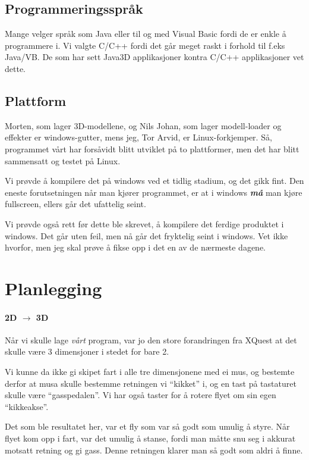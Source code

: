 \documentclass[11pt, dvips]{report}
\begin{document}
\section{Programmeringsspråk}

Mange velger språk som Java eller til og med Visual Basic fordi de er
enkle å programmere i. Vi valgte C/C++ fordi det går meget raskt i
forhold til f.eks Java/VB. De som har sett Java3D applikasjoner kontra
C/C++ applikasjoner vet dette.

\section{Plattform}

Morten, som lager 3D-modellene, og Nils Johan, som lager modell-loader
og effekter er windows-gutter, mens jeg, Tor Arvid, er
Linux-forkjemper. Så, programmet vårt har forsåvidt blitt utviklet på
to plattformer, men det har blitt sammensatt og testet på Linux.

Vi prøvde å kompilere det på windows ved et tidlig stadium, og det
gikk fint. Den eneste forutsetningen når man kjører programmet, er at
i windows \emph{\bf{må}} man kjøre fullscreen, ellers går det
ufattelig seint.

Vi prøvde også rett før dette ble skrevet, å kompilere det ferdige
produktet i windows. Det går uten feil, men nå går det fryktelig seint
i windows. Vet ikke hvorfor, men jeg skal prøve å fikse opp i det en
av de nærmeste dagene.

\chapter{Planlegging}

\subsubsection{2D $\rightarrow$ 3D}

Når vi skulle lage \emph{vårt} program, var jo den store forandringen
fra XQuest at det skulle være 3 dimensjoner i stedet for bare 2.

Vi kunne da ikke gi skipet fart i alle tre dimensjonene med ei mus, og
bestemte derfor at musa skulle bestemme retningen vi ``kikket'' i, og
en tast på tastaturet skulle være ``gasspedalen''. Vi har også taster
for å rotere flyet om sin egen ``kikkeakse''.

Det som ble resultatet her, var et fly som var så godt som umulig å
styre. Når flyet kom opp i fart, var det umulig å stanse, fordi man
måtte snu seg i akkurat motsatt retning og gi gass. Denne retningen
klarer man så godt som aldri å finne.
\end{document}

